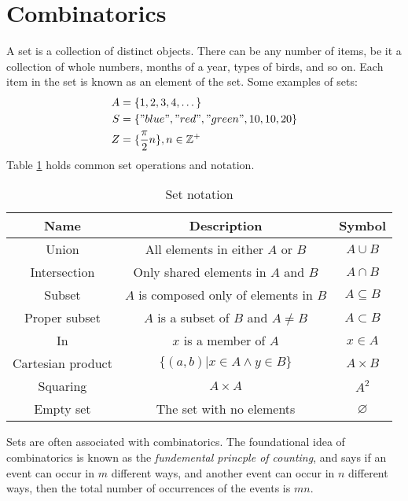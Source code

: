 \documentclass[nobib]{tufte-handout}
\begin{document}
\section{Combinatorics}
A set is a collection of distinct objects. 
There can be any number of items, be it a 
collection of whole numbers, months of a year, 
types of birds, and so on. Each item in the 
set is known as an element of the set. 
Some examples of sets: 
\begin{align*}
    A &= \{1, 2, 3, 4, \dots\} \\
    S &= \{"blue", "red", "green", 10, 10, 20\} \\
    Z &= \{\frac{\pi}{2}n\}, n \in \mathbb{Z^+}
\end{align*}
Table \ref{tab:setrules} holds common set operations and notation. 
\begin{table}[ht]
    \centering
    \caption{Set notation}
    \begin{tabular}{|c|c|c|}
    \hline
    Name & Description & Symbol\\
    \hline
    Union & All elements in either $A$ or $B$ & $A \cup B$ \\
    Intersection & Only shared elements in $A$ and $B$ & $A \cap B$\\
    Subset & $A$ is composed only of elements in $B$ & $A \subseteq B$ \\
    Proper subset & $A$ is a subset of $B$ and $A \neq B$ & $A \subset B$ \\ 
    In & $x$ is a member of $A$ & $x \in A$ \\
    Cartesian product & $\{(a, b) | x \in A \land y \in B\}$ & $A \times B$ \\
    Squaring & $A \times A$ & $A^2$ \\
    Empty set & The set with no elements & $\varnothing$ \\
    \hline
    \end{tabular}
    \label{tab:setrules}
\end{table}

Sets are often associated with combinatorics. The foundational idea of 
combinatorics is known as the \emph{fundemental princple of counting}, and says
if an event can occur in $m$ different ways, and another event can 
occur in $n$ different ways, then the total number of occurrences 
of the events is $mn$. 
\end{document}
